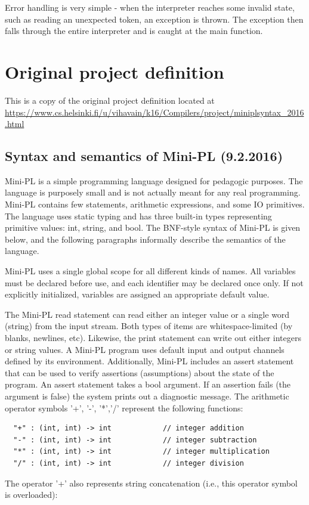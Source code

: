 \documentclass{article}
\begin{document}
Error handling is very simple - when the interpreter reaches some invalid
state, such as reading an unexpected token, an exception is thrown. The
exception then falls through the entire interpreter and is caught at the main
function.

\newpage
\appendix
\section{Original project definition}

This is a copy of the original project definition located at
\url{https://www.cs.helsinki.fi/u/vihavain/k16/Compilers/project/miniplsyntax\_2016.html}

\subsection{Syntax and semantics of Mini-PL (9.2.2016)}
Mini-PL is a simple programming language designed for pedagogic purposes. The
language is purposely small and is not actually meant for any real programming.
Mini-PL contains few statements, arithmetic expressions, and some IO
primitives. The language uses static typing and has three built-in types
representing primitive values: int, string, and bool. The BNF-style syntax of
Mini-PL is given below, and the following paragraphs informally describe the
semantics of the language.

Mini-PL uses a single global scope for all different kinds of names. All
variables must be declared before use, and each identifier may be declared once
only. If not explicitly initialized, variables are assigned an appropriate
default value.

The Mini-PL read statement can read either an integer value or a single word
(string) from the input stream. Both types of items are whitespace-limited (by
blanks, newlines, etc). Likewise, the print statement can write out either
integers or string values. A Mini-PL program uses default input and output
channels defined by its environment. Additionally, Mini-PL includes an assert
statement that can be used to verify assertions (assumptions) about the state
of the program. An assert statement takes a bool argument. If an assertion
fails (the argument is false) the system prints out a diagnostic message.  The
arithmetic operator symbols '+', '-', '*','/' represent the following
functions:

\begin{verbatim}
  "+" : (int, int) -> int            // integer addition
  "-" : (int, int) -> int            // integer subtraction
  "*" : (int, int) -> int            // integer multiplication
  "/" : (int, int) -> int            // integer division
\end{verbatim}
The operator '+' also represents string concatenation (i.e., this operator
symbol is overloaded):
\end{document}

